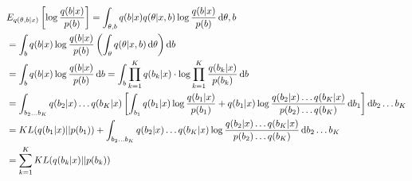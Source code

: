 \begin{equation}
\begin{aligned}
&E_{q(\theta,b|x)}\left[\log\frac{q(b|x)}{p(b)}\right]=\int_{\theta,b}q(b|x)q(\theta|x,b)\log \frac{q(b|x)}{p(b)}\dif\theta,b\\
&=\int_b q(b|x)\log \frac{q(b|x)}{p(b)}\left(\int_\theta q(\theta|x,b)\dif\theta\right)\dif b\\
&=\int_b q(b|x)\log \frac{q(b|x)}{p(b)}\dif b=\int_b \prod_{k=1}^K q(b_k|x)\cdot\log \prod_{k=1}^K\frac{q(b_k|x)}{p(b_k)}\dif b\\
&=\int_{b_2\dots b_K}q(b_2|x)\dots q(b_K|x)\left[\int_{b_1}q(b_1|x)\log \frac{q(b_1|x)}{p(b_1)}+q(b_1|x)\log \frac{q(b_2|x)\dots q(b_K|x)}{p(b_2)\dots q(b_K)}\dif b_1\right]\dif b_2\dots b_K\\
&=KL(q(b_1|x)||p(b_1))+\int_{b_2\dots b_K}q(b_2|x)\dots q(b_K|x)\log \frac{q(b_2|x)\dots q(b_K|x)}{p(b_2)\dots q(b_K)}\dif b_2\dots b_K\\
&=\sum_{k=1}^{K}KL(q(b_k|x)||p(b_k))
\end{aligned}
\end{equation}